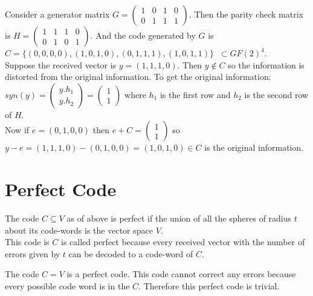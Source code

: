 \begin{example}
  Consider a generator matrix \(G=\begin{pmatrix}
    1 & 0 & 1 & 0\\
    0 & 1 & 1 & 1
  \end{pmatrix}\). Then the parity check matrix is \(H=\begin{pmatrix}
    1 & 1 & 1 & 0\\
    0 & 1 & 0 & 1
  \end{pmatrix}\). And the code generated by \(G\) is  \(C=\{(0,0,0,0),(1,0,1,0),(0,1,1,1),(1,0,1,1)\} \;\; \subset GF(2)^{4}\).\\

  Suppose the received vector is \(y=(1,1,1,0)\). Then \(y \not \in C\) so the information is distorted from the original information. To get the original information:\\
  \(syn(y)= \begin{pmatrix}
    y.h_1 \\ y.h_2
  \end{pmatrix} = \begin{pmatrix}
    1 \\ 1
  \end{pmatrix}\) where \(h_1\) is the first row and \(h_2\) is the second row of \(H\).\\
  Now if \(e=(0,1,0,0)\) then \(e+C=\begin{pmatrix}
    1 \\ 1
  \end{pmatrix}\) so \(y-e=(1,1,1,0)-(0,1,0,0)=(1,0,1,0) \in C\) is the original information.

\end{example}


\section{Perfect Code}
The code \(C \subseteq V\) as of above is perfect if the union of all the spheres of radius \(t\) about its code-words is the vector space \(V\).\\
This code is \(C\) is called perfect because every received vector with the number of errors given by \(t\) can be decoded to a code-word of \(C\).

\begin{example}
  The code \(C=V\) is a perfect code. This code cannot correct any errors because every possible code word is in the \(C\). Therefore this perfect code is trivial.
\end{example}

